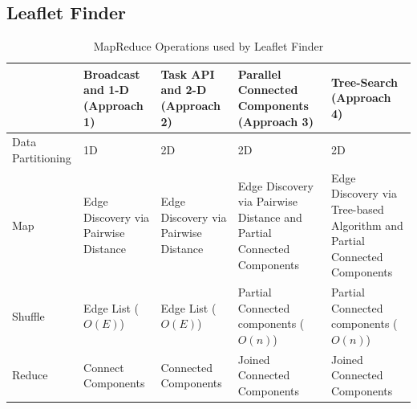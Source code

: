 \subsection{Leaflet Finder}
\label{sec:leaflet}
\begin{table}[ht]
    \centering
    \begin{tabular}{@{}p{2cm}|p{2.8cm}p{2.8cm}p{2.8cm}p{2.8cm}@{}}
        \toprule
        &
        \textbf{Broadcast and 1-D} (Approach 1) &
        \textbf{Task API and 2-D} (Approach 2) &
        \textbf{Parallel Connected Components} (Approach 3) &
        \textbf{Tree-Search} (Approach 4)\\
        \midrule
        Data Partitioning  & 
        1D  & 
        2D & 
        2D & 
        2D\\
        Map & 
        Edge Discovery via Pairwise Distance &
        Edge Discovery via Pairwise Distance &
        Edge Discovery via Pairwise Distance and Partial Connected Components & 
        Edge Discovery via Tree-based Algorithm and Partial Connected Components\\
        Shuffle &
        Edge List ($O(E)$) &
        Edge List ($O(E)$) &
        Partial Connected components ($O(n)$) &
        Partial Connected components ($O(n)$)\\
        Reduce   &
        Connect Components  &
        Connected Components &
        Joined Connected Components &
        Joined Connected Components\\
        \bottomrule
    \end{tabular}
    \caption{MapReduce Operations used by Leaflet Finder\label{tab:app_operators}}
\end{table}

